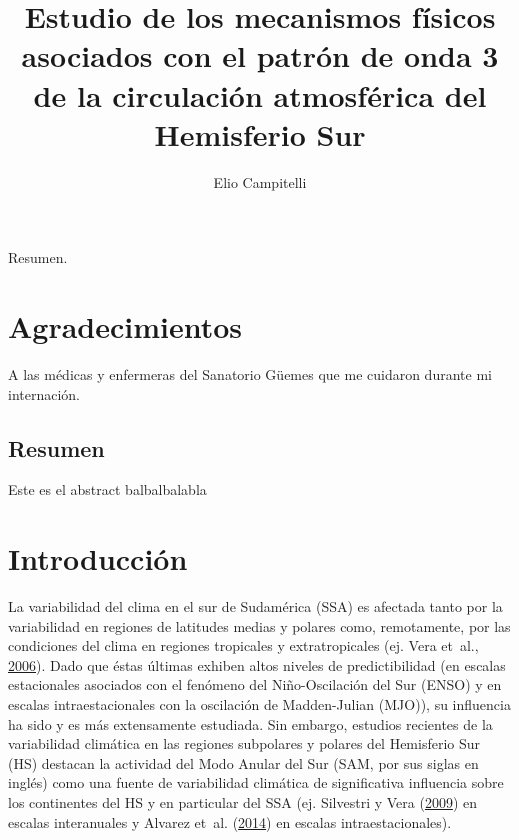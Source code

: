 \documentclass[spanish,a4paper,12pt]{book}
\title{Estudio de los mecanismos físicos asociados con el patrón de onda 3 de
la circulación atmosférica del Hemisferio Sur}
\author{Elio Campitelli}
\date{}
\begin{document}
\maketitle

Resumen.

\chapter*{Agradecimientos}

A las médicas y enfermeras del Sanatorio Güemes que me cuidaron durante
mi internación.

\newpage

\begin{center}\begin{minipage}{\dimexpr\paperwidth-7cm}
\chapter*{Resumen}
Este es el abstract balbalbalabla
\end{minipage}
\end{center}

\setcounter{tocdepth}{3} \tableofcontents

\listoffigures
\newpage

\chapter{Introducción}\label{introduccion}

La variabilidad del clima en el sur de Sudamérica (SSA) es afectada
tanto por la variabilidad en regiones de latitudes medias y polares
como, remotamente, por las condiciones del clima en regiones tropicales
y extratropicales (ej. Vera et~al.,
\protect\hyperlink{ref-Vera2006}{2006}). Dado que éstas últimas exhiben
altos niveles de predictibilidad (en escalas estacionales asociados con
el fenómeno del Niño-Oscilación del Sur (ENSO) y en escalas
intraestacionales con la oscilación de Madden-Julian (MJO)), su
influencia ha sido y es más extensamente estudiada. Sin embargo,
estudios recientes de la variabilidad climática en las regiones
subpolares y polares del Hemisferio Sur (HS) destacan la actividad del
Modo Anular del Sur (SAM, por sus siglas en inglés) como una fuente de
variabilidad climática de significativa influencia sobre los continentes
del HS y en particular del SSA (ej. Silvestri y Vera
(\protect\hyperlink{ref-Silvestri2009}{2009}) en escalas interanuales y
Alvarez et~al. (\protect\hyperlink{ref-Alvarez2014}{2014}) en escalas
intraestacionales).
\end{document}
